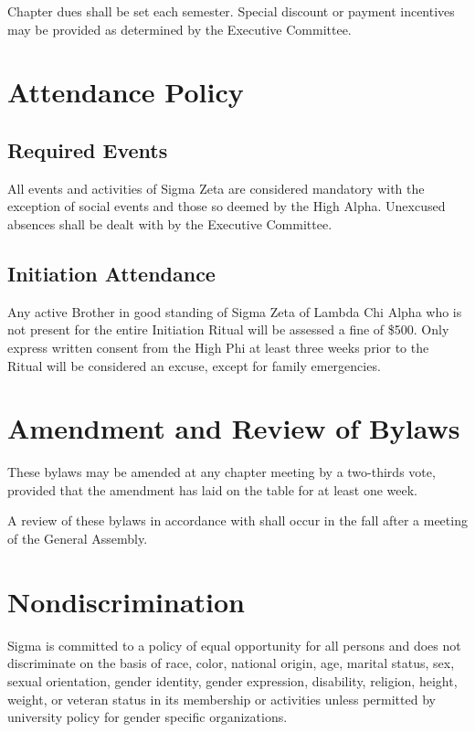 \documentclass{article}
\begin{document}
Chapter dues shall be set each semester. Special discount or payment incentives
may be provided as determined by the Executive Committee.

\section{Attendance Policy}\label{Attendance Policy}

\subsection{Required Events}

All events and activities of Sigma Zeta are considered mandatory with the
exception of social events and those so deemed by the High Alpha. Unexcused
absences shall be dealt with by the Executive Committee.

\subsection{Initiation Attendance}

Any active Brother in good standing of Sigma Zeta of Lambda Chi Alpha who is not
present for the entire Initiation Ritual will be assessed a fine of \$500. Only
express written consent from the High Phi at least three weeks prior to the
Ritual will be considered an excuse, except for family emergencies.

\section{Amendment and Review of Bylaws}

These bylaws may be amended at any chapter meeting by a two-thirds vote,
provided that the amendment has laid on the table for at least one week.

A review of these bylaws in accordance with 
shall occur in the fall after a meeting of the General Assembly. 

\section{Nondiscrimination}

Sigma 
is committed to a policy of equal opportunity for all persons and does not
discriminate on the basis of race, color, national origin, age, marital status,
sex, sexual orientation, gender identity, gender expression, disability,
religion, height, weight, or veteran status in its membership or activities
unless permitted by university policy for gender specific organizations.
\end{document}
